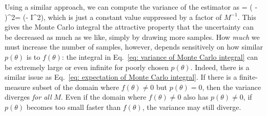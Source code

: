 Using a similar approach, we can compute the variance of the estimator as 
\beq
{} = \langle( - )^2\rangle = \left(\int {}\dd\theta - I^2\right),
\label{eq: variance of Monte Carlo integral}
\eeq
which is just a constant value suppressed by a factor of $M^{-1}$. This gives the Monte Carlo integral the attractive property that the uncertainty can be decreased as much as we like, simply by drawing more samples. How \textit{much} we must increase the number of samples, however, depends sensitively on how similar $p(\theta)$ is to $f(\theta)$: the integral in Eq.~\ref{eq: variance of Monte Carlo integral} can be extremely large or even infinite for poorly chosen $p(\theta)$. Indeed, there is a similar issue as Eq.~\ref{eq: expectation of Monte Carlo integral}. If there is a finite-measure subset of the domain where $f(\theta) \neq 0$ but $p(\theta) = 0$, then the variance diverges \textit{for all} $M$. Even if the domain where $f(\theta) \neq 0$ also has $p(\theta) \neq 0$, if $p(\theta)$ becomes too small faster than $f(\theta)$, the variance may still diverge.



